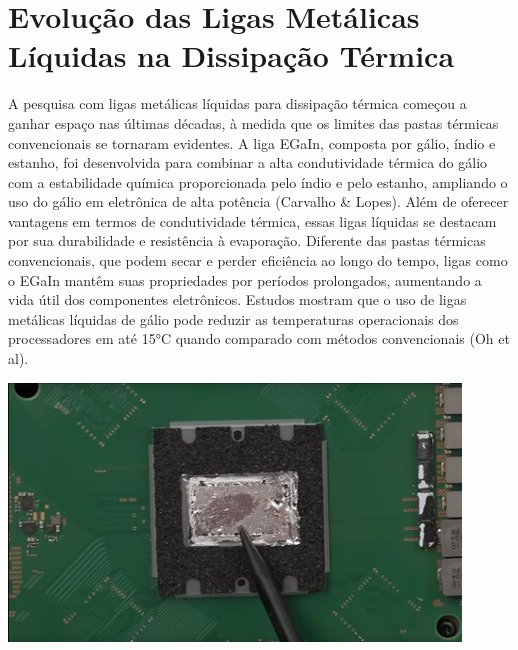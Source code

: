 \documentclass{article}
\begin{document}
\section{Evolução das Ligas Metálicas Líquidas na Dissipação Térmica}
A pesquisa com ligas metálicas líquidas para dissipação térmica começou a ganhar espaço nas últimas décadas, à medida que os limites das pastas térmicas convencionais se tornaram evidentes. A liga EGaIn, composta por gálio, índio e estanho, foi desenvolvida para combinar a alta condutividade térmica do gálio com a estabilidade química proporcionada pelo índio e pelo estanho, ampliando o uso do gálio em eletrônica de alta potência (Carvalho \& Lopes).
Além de oferecer vantagens em termos de condutividade térmica, essas ligas líquidas se destacam por sua durabilidade e resistência à evaporação. Diferente das pastas térmicas convencionais, que podem secar e perder eficiência ao longo do tempo, ligas como o EGaIn mantêm suas propriedades por períodos prolongados, aumentando a vida útil dos componentes eletrônicos. Estudos mostram que o uso de ligas metálicas líquidas de gálio pode reduzir as temperaturas operacionais dos processadores em até 15°C quando comparado com métodos convencionais (Oh et al).
\begin{adjustbox}{center,caption={},nofloat=figure,vspace=\bigskipamount}
    \centering
    \includegraphics[width=12cm]{chip.png}
\end{adjustbox}
\end{document}
